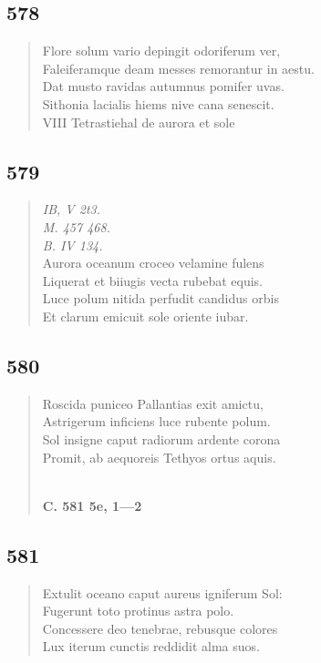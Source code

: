 \documentclass[11pt, a4paper]{report}
\begin{document}
            \subsection*{578}
      \begin{verse}
      Flore solum vario depingit odoriferum ver, \\ Faleiferamque deam messes remorantur in aestu. \\ Dat musto ravidas autumnus pomifer uvas. \\ Sithonia lacialis hiems nive cana senescit. \\ VIII  \lbrack Tetrastiehal de aurora et sole \\ 
      \end{verse}
  
            \subsection*{579}
      \begin{verse}
      \textit{IB, V 2t3.} \\ \textit{M. 457 468.} \\ \textit{B. IV 134.} \\ Aurora oceanum croceo velamine fulens \\ Liquerat et biiugis vecta rubebat equis. \\ Luce polum nitida perfudit candidus orbis \\ Et clarum emicuit sole oriente iubar. \\ 
      \end{verse}
  
            \subsection*{580}
      \begin{verse}
      Roscida puniceo Pallantias exit amictu, \\ Astrigerum inficiens luce rubente polum. \\ Sol insigne caput radiorum ardente corona \\ Promit, ab aequoreis Tethyos ortus aquis. \\ 
        ﻿\pagebreak 
     \marginpar{[80]} \begin{center} \textbf{C. 581 5e, 1—2} \end{center}
      \end{verse}
  
            \subsection*{581}
      \begin{verse}
      Extulit oceano caput aureus igniferum Sol: \\ Fugerunt toto protinus astra polo. \\ Concessere deo tenebrae, rebusque colores \\ Lux iterum cunctis reddidit alma suos. \\ 
      \end{verse}
  
\end{document}
